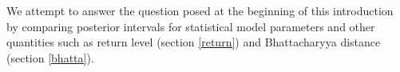 
We attempt to answer the question posed at the beginning of this introduction by comparing posterior intervals for statistical model parameters and other quantities such as return level (section \ref{return}) and Bhattacharyya distance (section \ref{bhatta}).


